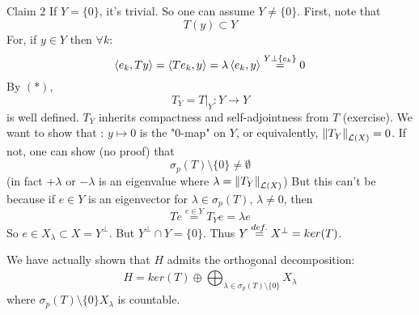 \begin{pf}{Claim 2}{}
	If $Y=\{0\}$, it's trivial. So one can assume $Y\neq\{0\}$. First, note that
	\begin{equation}T(y)\subset Y\tag{$*$}\end{equation}
	For, if $y\in Y$ then $\forall k$:
	\[\left<{e_k},{Ty}\right>=\left<{Te_k},{y}\right>=\lambda\left<{e_k},{y}\right>\stackrel{Y\perp\{e_k\}}{=}0\]
	By $(*)$,
	\[T_Y=T|_Y:Y\to Y\] is well defined. $T_Y$ inherits compactness and self-adjointness from $T$ (exercise). We want to show that : $y\mapsto0 $ is the  "0-map" on $Y$, or equivalently, $\left\|{T_Y}\right\|_{\mathcal{L}(X)}=0$. If not, one can show (no proof) that
	\[\sigma_p(T)\setminus\{0\}\neq\emptyset\]
	(in fact $+\lambda$ or $-\lambda$ is an eigenvalue where $\lambda=\left\|{T_Y}\right\|_{\mathcal{L}(X)}$) But this can't be because if $e\in Y$ is an eigenvector for $\lambda\in\sigma_p(T)$, $\lambda\neq 0$, then
	\[Te\stackrel{e\in Y}{=}T_Y e=\lambda e\]
	So $e\in X_\lambda\subset X=Y^\perp$. But $Y^\perp\cap Y=\{0\}$. Thus $Y\stackrel{def.}{=} X^\perp=ker(T)$.
 \end{pf}

\begin{remark}
	We have actually shown that $H$ admits the orthogonal decomposition:
	\[H=ker(T)\oplus
		\overline{\bigoplus_{\lambda\in\sigma_p(T)\setminus\{0\}}X_\lambda}
	\]
	where $\sigma_p(T)\setminus\{0\}X_\lambda$ is countable.
\end{remark}

